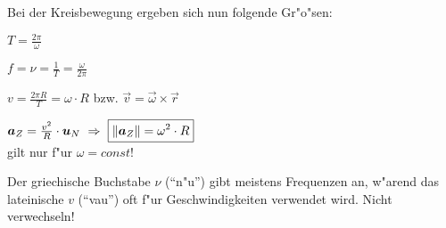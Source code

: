 Bei der Kreisbewegung ergeben sich nun folgende Gr"o"sen:
\begin{description}[\setlabelstyle{\bfseries\slshape}]
     \item[Periodendauer] $T = \frac{2\pi}{\omega}$
     \item[Frequenz] $f = \nu = \frac{1}{T} = \frac{\omega}{2\pi}$
     \item[Bahngeschwindigkeit] $\boxed{v = \frac{2\pi R}{T} = \omega \cdot R}$
bzw. $\vec v =  \vec \omega \times \vec r$
     \item[Zentripetalbeschleunigung] $\boldsymbol{a}_Z = \frac{v^2}{R} \cdot
        \boldsymbol{u}_N ~\Rightarrow ~ \boxed{\|\boldsymbol{a}_Z\| = \omega^2 \cdot R}$
        \\gilt nur f"ur $\omega = const$!
 \end{description}


\begin{Wichtig}[$\nu \neq v$]
   Der griechische Buchstabe $\nu$ ("`n"u"') gibt meistens Frequenzen
   an, w"arend das lateinische $v$ ("`vau"') oft f"ur Geschwindigkeiten
   verwendet wird. Nicht verwechseln!
\end{Wichtig}
















